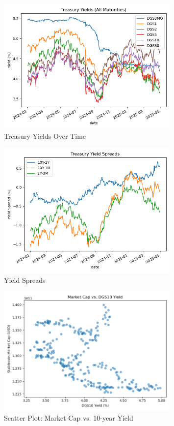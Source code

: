 \documentclass[12pt,a4paper]{article}
\begin{document}
\begin{figure}[H]
    \centering
    \includegraphics[width=0.8\textwidth]{figures/treasury_yields_all.png}
    \caption{Treasury Yields Over Time}
    \label{fig:yields}
\end{figure}

\begin{figure}[H]
    \centering
    \includegraphics[width=0.8\textwidth]{figures/treasury_yield_spreads.png}
    \caption{Yield Spreads}
    \label{fig:spreads}
\end{figure}

\begin{figure}[H]
    \centering
    \includegraphics[width=0.8\textwidth]{figures/marketcap_vs_DGS10.png}
    \caption{Scatter Plot: Market Cap vs. 10-year Yield}
    \label{fig:scatter}
\end{figure}
\end{document}
